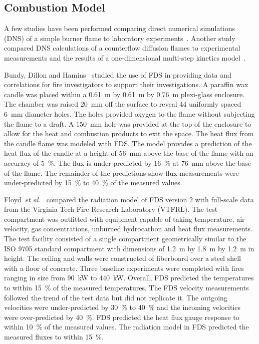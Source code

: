 \subsection{Combustion Model}

A few studies have been performed comparing direct numerical
simulations (DNS) of a simple burner flame to laboratory
experiments~\cite{Mukhopadhyay:1}. Another study compared DNS
calculations of a counterflow diffusion flames to experimental
measurements and the results of a one-dimensional multi-step kinetics
model~\cite{Hamins:NASA}.

Bundy,  Dillon and  Hamins~\cite{Dillon:1,Hamins:FPE2005}  studied the use of FDS  in providing data and correlations  for fire investigators to
support their investigations.   A paraffin  wax candle  was placed within  a  0.61~m by  0.61~m  by  0.76~m  plexi-glass enclosure.   The chamber was
raised 20~mm off the surface to reveal 44 uniformly spaced 6~mm diameter holes.   The holes provided oxygen to  the flame without subjecting the
flame to a draft.   A 150~mm hole was  provided at the top of the enclosure to allow  for the heat and combustion products to exit the space.  The
heat flux  from the candle flame was modeled with FDS.  The model  provides a prediction of the heat  flux of the candle at a height of  56~mm above
the base of the flame  with an accuracy of 5~\%. The flux is under predicted  by 16~\% at 76~mm above the base of the  flame. The remainder  of the
predictions show  flux measurements were under-predicted by 15~\% to 40~\% of the measured values.

Floyd~{\em et al.}~\cite{Floyd:1,Floyd:6} compared the radiation model of  FDS version 2  with full-scale  data from  the Virginia  Tech Fire
Research Laboratory (VTFRL).  The  test compartment was outfitted with equipment   capable   of  taking   temperature,   air  velocity,   gas
concentrations, unburned hydrocarbon  and heat flux measurements.  The test facility consisted of  a single compartment geometrically similar to the
ISO 9705 standard compartment with dimensions of 1.2~m by 1.8~m by  1.2~m  in height.   The  ceiling  and  walls were  constructed  of fiberboard
over  a steel  shell  with  a  floor of  concrete.   Three baseline experiments  were completed with  fires ranging in  size from 90~kW  to 440~kW.
Overall,  FDS  predicted  the  temperatures  to within  15~\%  of  the measured  temperatures.  The  FDS velocity  measurements  followed the trend
of  the test  data  but did  not  replicate  it.  The  outgoing velocities  were under-predicted by  30~\% to  40~\% and  the incoming velocities
were  over-predicted by 40~\%. FDS predicted  the heat flux gauge response to within 10~\%  of the measured values.  The radiation model  in FDS
predicted the  measured  fluxes to  within 15~\%.


